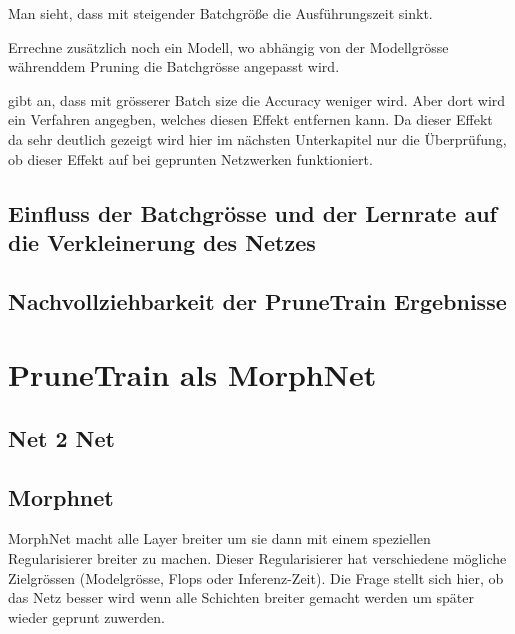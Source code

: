 Man sieht, dass mit steigender Batchgröße die Ausführungszeit sinkt. 

Errechne zusätzlich noch ein Modell, wo abhängig von der Modellgrösse währenddem Pruning die Batchgrösse angepasst wird.



\cite{largeBatch} gibt an, dass mit grösserer Batch size die Accuracy weniger wird. Aber dort wird ein Verfahren angegben, welches diesen Effekt entfernen kann.
Da dieser Effekt da sehr deutlich gezeigt wird hier im nächsten Unterkapitel nur die Überprüfung, ob dieser Effekt auf bei geprunten Netzwerken funktioniert.
\subsection{Einfluss der Batchgrösse und der Lernrate auf die Verkleinerung des Netzes}


\subsection{Nachvollziehbarkeit der PruneTrain Ergebnisse}

\section{PruneTrain als MorphNet}

\subsection{Net 2 Net}

\subsection{Morphnet}
MorphNet macht alle Layer breiter um sie dann mit einem speziellen Regularisierer breiter zu machen. Dieser Regularisierer hat verschiedene mögliche Zielgrössen (Modelgrösse, Flops oder Inferenz-Zeit).
Die Frage stellt sich hier, ob das Netz besser wird wenn alle Schichten breiter gemacht werden um später wieder geprunt zuwerden.

